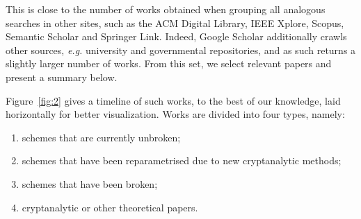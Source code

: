 \documentclass[openright]{report}
\begin{document}
This is close to the number of works obtained when grouping all analogous searches in other sites, such as the ACM Digital Library, IEEE Xplore, Scopus, Semantic Scholar and Springer Link. Indeed, Google Scholar additionally crawls other sources, \emph{e.g.} university and governmental repositories, and as such returns a slightly larger number of works. From this set, we select relevant papers and present a summary below.

Figure~\ref{fig:2} gives a timeline of such works, to the best of our knowledge, laid horizontally for better visualization. Works are divided into four types, namely:

\begin{enumerate}[label=(\roman*), itemsep=1pt]
  \item\label{enum:i} schemes that are currently unbroken;
  \item\label{enum:ii} schemes that have been reparametrised due to new cryptanalytic methods;
  \item\label{enum:iii} schemes that have been broken;
  \item\label{enum:iv} cryptanalytic or other theoretical papers.
\end{enumerate}
\end{document}
